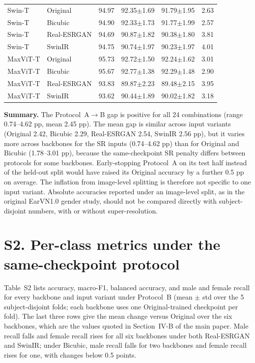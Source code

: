 \documentclass[11pt]{article}
\begin{document}
\begin{longtable}{@{}llrrrr@{}}
\addlinespace
Swin-T           & Original    & 94.97 & 92.35$\pm$1.69 & 91.79$\pm$1.95 & 2.63 \\
Swin-T           & Bicubic     & 94.90 & 92.33$\pm$1.73 & 91.77$\pm$1.99 & 2.57 \\
Swin-T           & Real-ESRGAN & 94.69 & 90.87$\pm$1.82 & 90.38$\pm$1.80 & 3.81 \\
Swin-T           & SwinIR      & 94.75 & 90.74$\pm$1.97 & 90.23$\pm$1.97 & 4.01 \\
\addlinespace
MaxViT-T         & Original    & 95.73 & 92.72$\pm$1.50 & 92.24$\pm$1.62 & 3.01 \\
MaxViT-T         & Bicubic     & 95.67 & 92.77$\pm$1.38 & 92.29$\pm$1.48 & 2.90 \\
MaxViT-T         & Real-ESRGAN & 93.83 & 89.87$\pm$2.23 & 89.48$\pm$2.15 & 3.95 \\
MaxViT-T         & SwinIR      & 93.62 & 90.44$\pm$1.89 & 90.02$\pm$1.82 & 3.18 \\
\bottomrule
\end{longtable}

\bigskip
\noindent\textbf{Summary.} The Protocol~A$\to$B gap is positive for all 24 combinations (range 0.74--4.62 pp, mean 2.45 pp). The mean gap is similar across input variants (Original 2.42, Bicubic 2.29, Real-ESRGAN 2.54, SwinIR 2.56 pp), but it varies more across backbones for the SR inputs (0.74--4.62 pp) than for Original and Bicubic (1.78--3.01 pp), because the same-checkpoint SR penalty differs between protocols for some backbones. Early-stopping Protocol~A on its test half instead of the held-out split would have raised its Original accuracy by a further 0.5 pp on average. The inflation from image-level splitting is therefore not specific to one input variant. Absolute accuracies reported under an image-level split, as in the original EarVN1.0 gender study, should not be compared directly with subject-disjoint numbers, with or without super-resolution.

\section*{S2. Per-class metrics under the same-checkpoint protocol}
\noindent Table~S2 lists accuracy, macro-F1, balanced accuracy, and male and female recall for every backbone and input variant under Protocol~B (mean $\pm$ std over the 5 subject-disjoint folds; each backbone uses one Original-trained checkpoint per fold). The last three rows give the mean change versus Original over the six backbones, which are the values quoted in Section~IV-B of the main paper. Male recall falls and female recall rises for all six backbones under both Real-ESRGAN and SwinIR; under Bicubic, male recall falls for two backbones and female recall rises for one, with changes below 0.5 points.
\end{document}
